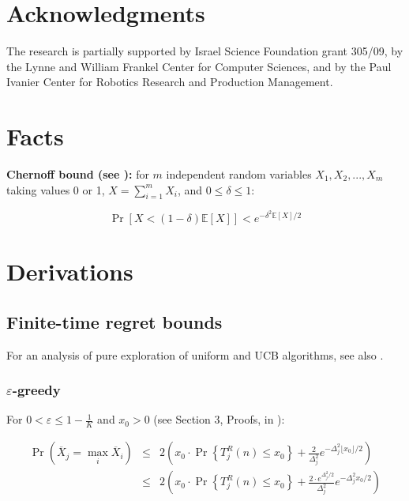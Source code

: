 \documentclass{article}
\newcommand {\IE} {\ensuremath {\mathbb{E}}}
\begin{document}
\section*{Acknowledgments}

The research is partially supported by Israel
Science Foundation grant 305/09, by the Lynne and William Frankel
Center for Computer Sciences, and by the Paul Ivanier Center for
Robotics Research and Production Management.




\pagebreak

\appendix

\section{Facts}

{\bf Chernoff bound (see \cite{Hagerup.chernoff}):} for $m$ independent random variables $X_1, X_2, ..., X_m$
taking values 0 or 1, $X=\sum_{i=1}^m X_i$, and $0\le\delta\le 1$:

\begin{equation}
\label{eq:chernoff-bound}
\Pr[X < (1-\delta)\IE[X]] < e^{-\delta^2\IE[X]/2}
\end{equation}

\section{Derivations}
\label{app:derivations}

\subsection{Finite-time regret bounds}
\label{app:derivations-finite}

For an analysis of pure exploration of uniform and UCB algorithms, see also
\cite{Bubeck.pure}.


\subsubsection{$\varepsilon$-greedy}
\label{app:derivations-finite-eps}

For $0<\varepsilon\le1-\frac 1 K$ and $x_0>0$ (see Section 3, Proofs, in \cite{Auer.ucb}):

\begin{eqnarray}
\Pr(\overline X_j=\max_i\overline X_i)&\le&2\left(x_0\cdot \Pr\left\{T_j^R(n)\le x_0\right\} + \frac 2{\Delta_j^2}e^{-\Delta_j^2\lfloor x_0 \rfloor/2}\right)\nonumber\\
&\le&2\left(x_0\cdot \Pr\left\{T_j^R(n)\le x_0\right\} + \frac {2 \cdot
  e^{\Delta_j^2/2}}{\Delta_j^2}e^{-\Delta_j^2 x_0 /2}\right)
\end{eqnarray}
\end{document}
